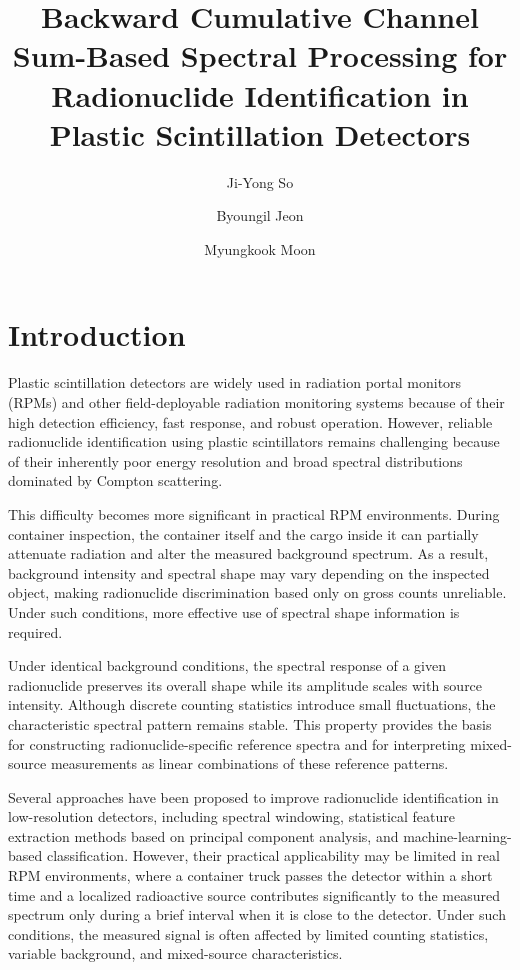 \documentclass[fleqn, 10pt]{wlscirep}
\title{Backward Cumulative Channel Sum-Based Spectral Processing for Radionuclide Identification in Plastic Scintillation Detectors}
\author[1]{Ji-Yong So}
\author[2]{Byoungil Jeon}
\author[1,*]{Myungkook Moon}
\affil[1]{Korea Atomic Energy Research Institute, Neutron Science Division, Daejeon, 34057, Korea}
\affil[2]{Korea Atomic Energy Research Institute, Applied Artificial Intelligence Section, Daejeon, 34057, Korea}
\affil[*]{moonmk@kaeri.re.kr}
\begin{document}
\flushbottom
\maketitle

\thispagestyle{empty}


\section*{Introduction}

Plastic scintillation detectors are widely used in radiation portal monitors (RPMs) and other
field-deployable radiation monitoring systems because of their high detection efficiency, fast response, and robust operation\cite{Sicilliano2005Comparision, Bertrand2014Current,Ely2006TheUse,Hevener2013EWindow}. However, reliable radionuclide identification using plastic scintillators remains challenging because of their inherently poor energy resolution and broad spectral distributions dominated by Compton scattering\cite{Hevener2013EWindow, Lee2020Radioisotope, Paff2017Spectral,Runkle2006Analysis}. 

This difficulty becomes more significant in practical RPM environments. During container inspection, the container itself and the cargo inside it can partially attenuate radiation and alter the measured background spectrum. As a result, background intensity and spectral shape may vary depending on the inspected object, making radionuclide discrimination based only on gross counts unreliable\cite{Lee2020Radioisotope, Paff2017Spectral,Runkle2006Analysis,Kim2019InvMat}. Under such conditions, more effective use of spectral shape information is required.

Under identical background conditions, the spectral response of a given radionuclide preserves its overall shape while its amplitude scales with source intensity. Although discrete counting statistics introduce small fluctuations, the characteristic spectral pattern remains stable. This property provides the basis for constructing radionuclide-specific reference spectra and for interpreting mixed-source measurements as linear combinations of these reference patterns.

Several approaches have been proposed to improve radionuclide identification in low-resolution detectors, including spectral windowing\cite{Ely2006TheUse,Hevener2013EWindow}, statistical feature extraction methods based on principal component analysis\cite{Runkle2006Analysis,Kim2019InvMat}, 
and machine-learning-based classification\cite{Kim2019ANN, Lee2023Radionuclide,Jeon2021CompML}. However, their practical applicability may be limited in real RPM environments, where a container truck passes the detector within a short time and a localized radioactive source contributes significantly to the measured spectrum only during a brief interval when it is close to the detector. Under such conditions, the measured signal is often affected by limited counting statistics, variable background, and mixed-source characteristics.
\end{document}
